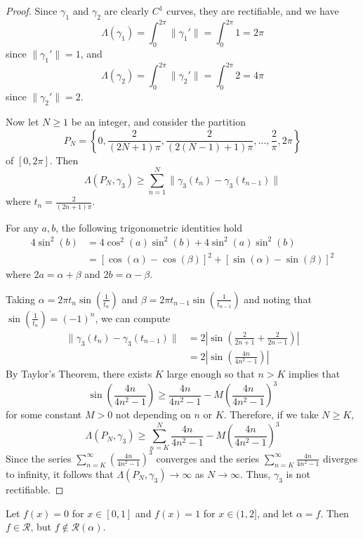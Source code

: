 \documentclass{homework}
\begin{document}
\begin{proof}
		Since $\gamma_1$ and $\gamma_2$ are clearly $C^1$ curves, they are rectifiable, and we have
		$$
		\Lambda(\gamma_1) = \int_0^{2\pi}\lVert\gamma_1'\rVert = \int_0^{2\pi}1 = 2\pi
		$$
		since $\lVert\gamma_1'\rVert = 1$, and
		$$
		\Lambda(\gamma_2) = \int_0^{2\pi}\lVert\gamma_2'\rVert = \int_0^{2\pi}2 = 4\pi
		$$
		since $\lVert\gamma_2'\rVert = 2$.
		
		Now let $N \ge 1$ be an integer, and consider the partition
		$$
		P_N = \left\lbrace0, \frac{2}{(2N+1)\pi}, \frac{2}{(2(N-1) + 1)\pi}, \dots, \frac{2}{\pi}, 2\pi \right\rbrace
		$$
		of $[0, 2\pi]$. Then
		$$
		\Lambda(P_N, \gamma_3) \ge \sum_{n=1}^N\lVert\gamma_3(t_n) - \gamma_3(t_{n-1})\rVert
		$$
		where $t_n = \frac{2}{(2n+1)\pi}$.
		
		For any $a, b$, the following trigonometric identities hold
		$$
		\begin{aligned}
			4\sin^2(b) &= 4\cos^2(a)\sin^2(b) + 4\sin^2(a)\sin^2(b) \\
			&= [\cos(\alpha) - \cos(\beta)]^2 + [\sin(\alpha) - \sin(\beta)]^2
		\end{aligned}
		$$
		where $2a = \alpha + \beta$ and $2b = \alpha - \beta$.
		
		Taking $\alpha = 2\pi t_n \sin\left(\frac{1}{t_n}\right)$ and $\beta = 2\pi t_{n-1}\sin\left(\frac{1}{t_{n-1}}\right)$ and noting that $\sin\left(\frac{1}{t_n}\right) = (-1)^n$, we can compute
		$$
		\begin{aligned}
			\lVert\gamma_3(t_n) - \gamma_3(t_{n-1})\rVert &= 2\left|\sin\left(\frac{2}{2n+1} + \frac{2}{2n-1}\right)\right|\\
			&=2\left|\sin\left(\frac{4n}{4n^2 -1}\right)\right|
		\end{aligned}
		$$
		By Taylor's Theorem, there exists $K$ large enough so that $n > K$ implies that
		$$
		\sin\left(\frac{4n}{4n^2-1}\right) \ge \frac{4n}{4n^2-1} - M\left(\frac{4n}{4n^2-1}\right)^3
		$$
		for some constant $M > 0$ not depending on $n$ or $K$. Therefore, if we take $N \ge K$,
		$$
		\Lambda(P_N, \gamma_3) \ge \sum_{n=K}^N \frac{4n}{4n^2-1} - M\left(\frac{4n}{4n^2-1}\right)^3
		$$
		Since the series $\sum_{n=K}^\infty \left(\frac{4n}{4n^2-1}\right)^3$ converges and the series $\sum_{n=K}^\infty \frac{4n}{4n^2-1}$ diverges to infinity, it follows that $\Lambda(P_N, \gamma_3) \to \infty$ as $N \to \infty$. Thus, $\gamma_3$ is not rectifiable.
	\end{proof}
	
	
	Let $f(x) = 0$ for $x \in [0, 1]$ and $f(x) = 1$ for $x \in (1,2]$, and let $\alpha = f$. Then $f \in \mathscr{R}$, but $f \notin \mathscr{R}(\alpha)$.
	
\end{document}
